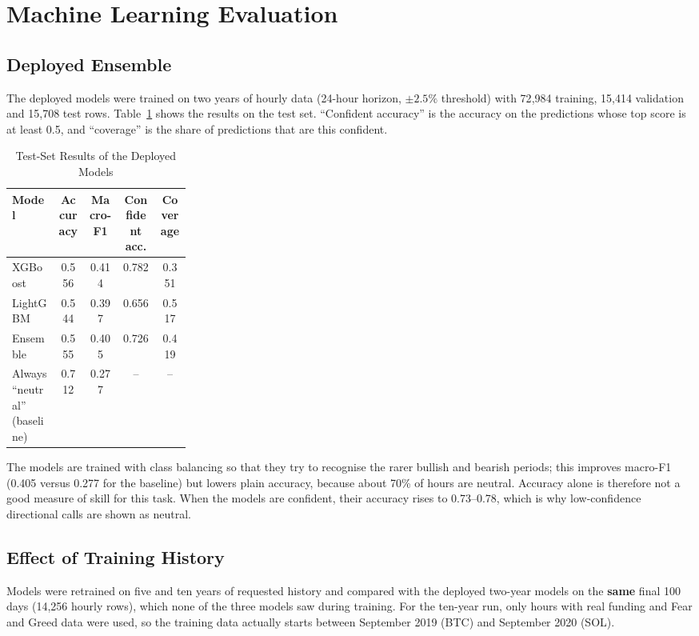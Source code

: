 \section{Machine Learning Evaluation}
\subsection{Deployed Ensemble}
The deployed models were trained on two years of hourly data (24-hour horizon, $\pm2.5\%$ threshold) with 72{,}984 training, 15{,}414 validation and 15{,}708 test rows. Table~\ref{tab:ml-deployed} shows the results on the test set. ``Confident accuracy'' is the accuracy on the predictions whose top score is at least 0.5, and ``coverage'' is the share of predictions that are this confident.

{\renewcommand{\arraystretch}{1.3}
\begin{longtable}{|p{0.26\linewidth}|c|c|c|c|}
\caption{Test-Set Results of the Deployed Models}\label{tab:ml-deployed}\\\hline
\textbf{Model} & \textbf{Accuracy} & \textbf{Macro-F1} & \textbf{Confident acc.} & \textbf{Coverage}\\\hline
XGBoost & 0.556 & 0.414 & 0.782 & 0.351\\\hline
LightGBM & 0.544 & 0.397 & 0.656 & 0.517\\\hline
Ensemble & 0.555 & 0.405 & 0.726 & 0.419\\\hline
Always ``neutral'' (baseline) & 0.712 & 0.277 & -- & --\\\hline
\end{longtable}}

The models are trained with class balancing so that they try to recognise the rarer bullish and bearish periods; this improves macro-F1 (0.405 versus 0.277 for the baseline) but lowers plain accuracy, because about 70\% of hours are neutral. Accuracy alone is therefore not a good measure of skill for this task. When the models are confident, their accuracy rises to 0.73--0.78, which is why low-confidence directional calls are shown as neutral.

\subsection{Effect of Training History}
Models were retrained on five and ten years of requested history and compared with the deployed two-year models on the \textbf{same} final 100 days (14{,}256 hourly rows), which none of the three models saw during training. For the ten-year run, only hours with real funding and Fear and Greed data were used, so the training data actually starts between September 2019 (BTC) and September 2020 (SOL).

